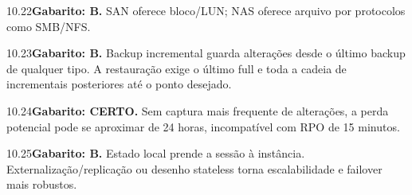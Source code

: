 \begin{solucao}{10.22}\textbf{Gabarito: B.} SAN oferece bloco/LUN; NAS oferece arquivo por protocolos como SMB/NFS.\end{solucao}
\begin{solucao}{10.23}\textbf{Gabarito: B.} Backup incremental guarda alterações desde o último backup de qualquer tipo. A restauração exige o último full e toda a cadeia de incrementais posteriores até o ponto desejado.\end{solucao}
\begin{solucao}{10.24}\textbf{Gabarito: CERTO.} Sem captura mais frequente de alterações, a perda potencial pode se aproximar de 24 horas, incompatível com RPO de 15 minutos.\end{solucao}
\begin{solucao}{10.25}\textbf{Gabarito: B.} Estado local prende a sessão à instância. Externalização/replicação ou desenho stateless torna escalabilidade e failover mais robustos.\end{solucao}


